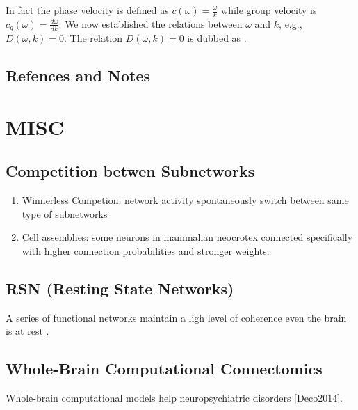 \documentclass[letterpaper,10pt,english]{sphinxmanual}
\begin{document}
In fact the phase velocity is defined as \(c(\omega) = \frac{\omega}{k}\) while group velocity is \(c_{g}(\omega) = \frac{d\omega}{dk}\). We now established the relations between \(\omega\) and \(k\), e.g., \(D(\omega,k)=0\). The relation \(D(\omega,k)=0\) is dubbed as .


\subsection{Refences and Notes}
\label{\detokenize{neuroscience/dispersion-relation:refences-and-notes}}

\section{MISC}
\label{\detokenize{neuroscience/misc::doc}}\label{\detokenize{neuroscience/misc:misc}}

\subsection{Competition betwen Subnetworks}
\label{\detokenize{neuroscience/misc:competition-betwen-subnetworks}}\begin{enumerate}
\item {} 
Winnerless Competion: network activity spontaneously switch between same type of subnetworks

\item {} 
Cell assemblies: some neurons in mammalian neocrotex connected specifically with higher connection probabilities and stronger weights.

\end{enumerate}


\subsection{RSN (Resting State Networks)}
\label{\detokenize{neuroscience/misc:rsn-resting-state-networks}}\label{\detokenize{neuroscience/misc:resting-state-networks}}
A series of functional networks maintain a ligh level of coherence even the brain is at rest \label{\detokenize{neuroscience/misc:id1}}{\hyperref[\detokenize{neuroscience/misc:deco2010}]{\sphinxcrossref{{[}Deco2010{]}}}}.


\subsection{Whole-Brain Computational Connectomics}
\label{\detokenize{neuroscience/misc:whole-brain-computational-connectomics}}
Whole-brain computational models help neuropsychiatric disorders {[}Deco2014{]}.
\end{document}
